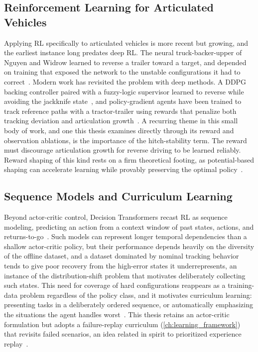 \subsection{Reinforcement Learning for Articulated Vehicles}
Applying RL specifically to articulated vehicles is more recent but growing, and the earliest instance long predates deep RL. The neural truck-backer-upper of Nguyen and Widrow learned to reverse a trailer toward a target, and depended on training that exposed the network to the unstable configurations it had to correct~\cite{nguyen1990truck}. Modern work has revisited the problem with deep methods. A DDPG backing controller paired with a fuzzy-logic supervisor learned to reverse while avoiding the jackknife state~\cite{bejar2018backing}, and policy-gradient agents have been trained to track reference paths with a tractor-trailer using rewards that penalize both tracking deviation and articulation growth~\cite{kang2024tractortrailer}. A recurring theme in this small body of work, and one this thesis examines directly through its reward and observation ablations, is the importance of the hitch-stability term. The reward must discourage articulation growth for reverse driving to be learned reliably. Reward shaping of this kind rests on a firm theoretical footing, as potential-based shaping can accelerate learning while provably preserving the optimal policy~\cite{ng1999shaping}.

\subsection{Sequence Models and Curriculum Learning}
Beyond actor-critic control, Decision Transformers recast RL as sequence modeling, predicting an action from a context window of past states, actions, and returns-to-go~\cite{chen2021decision}. Such models can represent longer temporal dependencies than a shallow actor-critic policy, but their performance depends heavily on the diversity of the offline dataset, and a dataset dominated by nominal tracking behavior tends to give poor recovery from the high-error states it underrepresents, an instance of the distribution-shift problem that motivates deliberately collecting such states. This need for coverage of hard configurations reappears as a training-data problem regardless of the policy class, and it motivates curriculum learning: presenting tasks in a deliberately ordered sequence, or automatically emphasizing the situations the agent handles worst~\cite{bengio2009curriculum, narvekar2020curriculum}. This thesis retains an actor-critic formulation but adopts a failure-replay curriculum (\cref{ch:learning_framework}) that revisits failed scenarios, an idea related in spirit to prioritized experience replay~\cite{schaul2016per}.

